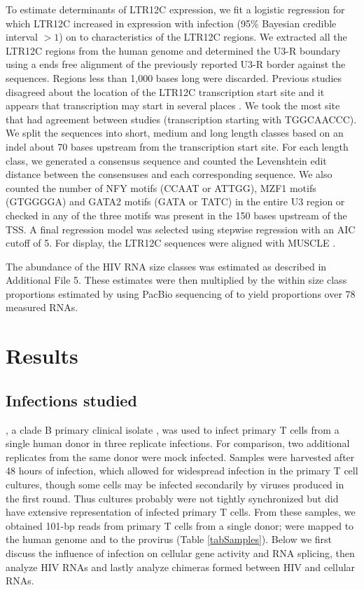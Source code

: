 \documentclass[../sherrill-Mix_thesis.tex]{subfiles}
\begin{document}
		To estimate determinants of LTR12C expression, we fit a logistic regression for which LTR12C increased in expression with \hivEight{} infection (95\% Bayesian credible interval $>1$) on to characteristics of the LTR12C regions. We extracted all the LTR12C regions from the human genome and determined the U3-R boundary using a ends free alignment of the previously reported U3-R border \citep{LaMantia1991,LaMantia1992,Plant2001,Ling2002,Yu2005} against the sequences. Regions less than 1,000 bases long were discarded. Previous studies disagreed about the location of the LTR12C transcription start site and it appears that transcription may start in several places \citep{LaMantia1992,Plant2001}. We took the \fivePrime{} most site that had agreement between studies (transcription starting with TGGCAACCC). We split the sequences into short, medium and long length classes based on an indel about 70 bases upstream from the transcription start site. For each length class, we generated a consensus sequence and counted the Levenshtein edit distance between the consensuses and each corresponding sequence. We also counted the number of NFY motifs (CCAAT or ATTGG), MZF1 motifs (GTGGGGA) and GATA2 motifs (GATA or TATC) in the entire U3 region or checked in any of the three motifs was present in the 150 bases upstream of the TSS. A final regression model was selected using stepwise regression with an AIC cutoff of 5. For display, the LTR12C sequences were aligned with MUSCLE \citep{Edgar2004}.

		The abundance of the HIV RNA size classes was estimated as described in Additional File 5. These estimates were then multiplied by the within size class proportions estimated by \citet{Ocwieja2012} using PacBio sequencing of \hivEight{} to yield proportions over 78 measured \hivEight{} RNAs.
		

\section{Results}
	\subsection{Infections studied}
		\hivEight{}, a clade B primary clinical isolate \citep{Collman1992}, was used to infect primary \cdFour{} T cells from a single human donor in three replicate infections. For comparison, two additional replicates from the same donor were mock infected. Samples were harvested after 48 hours of infection, which allowed for widespread infection in the primary T cell cultures, though some cells may be infected secondarily by viruses produced in the first round.  Thus cultures probably were not tightly synchronized but did have extensive representation of infected primary T cells. From these samples, we obtained \nReads{} 101-bp reads from primary \cdFour{} T cells from a single donor; \nHuman{} were mapped to the human genome and \nHIV{} to the \hivEight{} provirus (Table \ref{tabSamples}). Below we first discuss the influence of infection on cellular gene activity and RNA splicing, then analyze HIV RNAs and lastly analyze chimeras formed between HIV and cellular RNAs.
\end{document}
